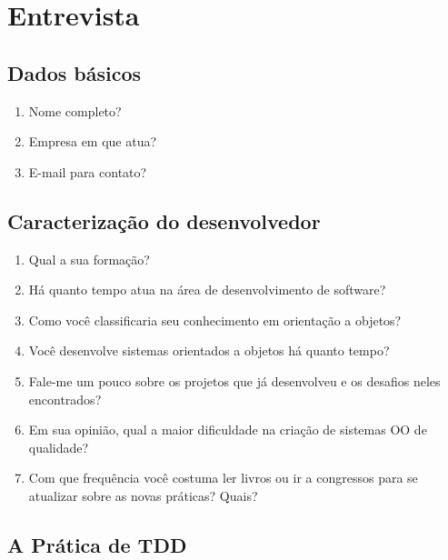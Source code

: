 \chapter{Entrevista}
\label{ape:entrevista}

\section{Dados básicos}

\begin{enumerate}
	\item Nome completo?

	\item Empresa em que atua?

	\item E-mail para contato?

\end{enumerate}

\section{Caracterização do desenvolvedor}

\begin{enumerate}
	\item Qual a sua formação?

	\item Há quanto tempo atua na área de desenvolvimento de software?

	\item Como você classificaria seu conhecimento em orientação a objetos?

	\item Você desenvolve sistemas orientados a objetos há quanto tempo?	

	\item Fale-me um pouco sobre os projetos que já desenvolveu e os desafios 
	neles encontrados?

	\item Em sua opinião, qual a maior dificuldade na criação de sistemas OO de
	qualidade?

	\item Com que frequência você costuma ler livros ou ir a congressos para se 
	atualizar sobre as novas práticas? Quais?
\end{enumerate}

\section{A Prática de TDD}

